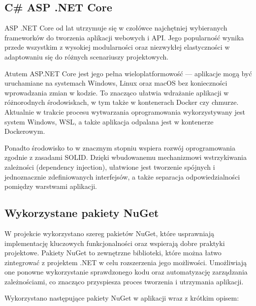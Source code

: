 \subsection{C\# ASP .NET Core}

ASP .NET Core od lat utrzymuje się w czołówce najchętniej wybieranych frameworków do tworzenia aplikacji webowych i API. Jego popularność wynika przede wszystkim z wysokiej modularności oraz niezwykłej elastyczności w adaptowaniu się do różnych scenariuszy projektowych.

Atutem ASP.NET Core jest jego pełna wieloplatformowość — aplikacje mogą być uruchamiane na systemach Windows, Linux oraz macOS bez konieczności wprowadzania zmian w kodzie. To znacząco ułatwia wdrażanie aplikacji w różnorodnych środowiskach, w tym także w kontenerach Docker czy chmurze. Aktualnie w trakcie procesu wytwarzania oprogramowania wykorzystywany jest system Windows, WSL, a także aplikacja odpalana jest w kontenerze Dockerowym.

Ponadto środowisko to w znacznym stopniu wspiera rozwój oprogramowania zgodnie z zasadami SOLID. Dzięki wbudowanemu mechanizmowi wstrzykiwania zależności (dependency injection), ułatwione jest tworzenie spójnych i jednoznacznie zdefiniowanych interfejsów, a także separacja odpowiedzialności pomiędzy warstwami aplikacji.


\subsection{Wykorzystane pakiety NuGet}

W projekcie wykorzystano szereg pakietów NuGet, które usprawniają implementację kluczowych funkcjonalności oraz wspierają dobre praktyki projektowe. Pakiety NuGet to zewnętrzne biblioteki, które można łatwo zintegrować z projektem .NET w celu rozszerzenia jego możliwości. Umożliwiają one ponowne wykorzystanie sprawdzonego kodu oraz automatyzację zarządzania zależnościami, co znacząco przyspiesza proces tworzenia i utrzymania aplikacji.

Wykorzystano następujące pakiety NuGet w aplikacji wraz z krótkim opisem:

